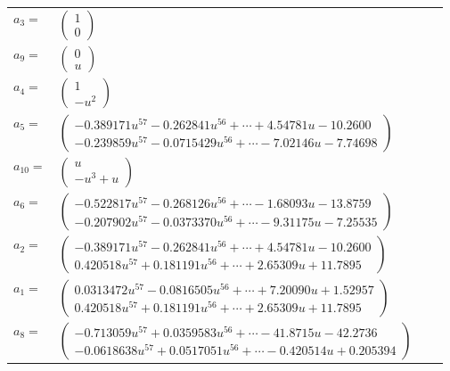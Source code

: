 \documentclass[1p]{elsarticle_modified}
\theoremstyle{definition}
\begin{document}
\begin{tabular}{m{7pt} m{180pt} m{7pt} m{180pt} }
\flushright $a_{3}=$&$\begin{pmatrix}1\\0\end{pmatrix}$ \\
\flushright $a_{9}=$&$\begin{pmatrix}0\\u\end{pmatrix}$ \\
\flushright $a_{4}=$&$\begin{pmatrix}1\\- u^2\end{pmatrix}$ \\
\flushright $a_{5}=$&$\begin{pmatrix}-0.389171 u^{57}-0.262841 u^{56}+\cdots+4.54781 u-10.2600\\-0.239859 u^{57}-0.0715429 u^{56}+\cdots-7.02146 u-7.74698\end{pmatrix}$ \\
\flushright $a_{10}=$&$\begin{pmatrix}u\\- u^3+u\end{pmatrix}$ \\
\flushright $a_{6}=$&$\begin{pmatrix}-0.522817 u^{57}-0.268126 u^{56}+\cdots-1.68093 u-13.8759\\-0.207902 u^{57}-0.0373370 u^{56}+\cdots-9.31175 u-7.25535\end{pmatrix}$ \\
\flushright $a_{2}=$&$\begin{pmatrix}-0.389171 u^{57}-0.262841 u^{56}+\cdots+4.54781 u-10.2600\\0.420518 u^{57}+0.181191 u^{56}+\cdots+2.65309 u+11.7895\end{pmatrix}$ \\
\flushright $a_{1}=$&$\begin{pmatrix}0.0313472 u^{57}-0.0816505 u^{56}+\cdots+7.20090 u+1.52957\\0.420518 u^{57}+0.181191 u^{56}+\cdots+2.65309 u+11.7895\end{pmatrix}$ \\
\flushright $a_{8}=$&$\begin{pmatrix}-0.713059 u^{57}+0.0359583 u^{56}+\cdots-41.8715 u-42.2736\\-0.0618638 u^{57}+0.0517051 u^{56}+\cdots-0.420514 u+0.205394\end{pmatrix}$ \\

\end{tabular}
\end{document}
